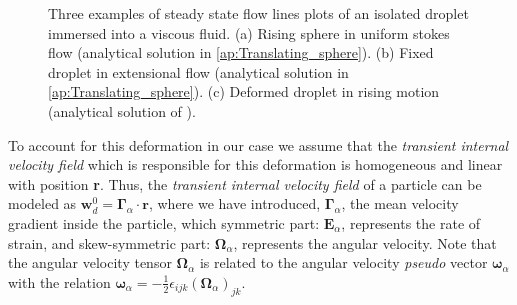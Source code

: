 \begin{figure}
    \centering
    \caption{Three examples of steady state flow lines plots of an isolated droplet immersed into a viscous fluid. 
    (a) Rising sphere in uniform stokes flow (analytical solution in \ref{ap:Translating_sphere}). 
    (b) Fixed droplet in extensional flow (analytical solution in \ref{ap:Translating_sphere}).
    (c) Deformed droplet in rising motion (analytical solution of \citet{taylor1964deformation}). }
    \label{fig:flowlines}
\end{figure} 
To account for this deformation in our case we assume that the \textit{transient internal velocity field} which is responsible for this deformation is homogeneous and linear with position \textbf{r}. 
Thus, the \textit{transient internal velocity field} of a particle can be modeled as $\textbf{w}_d^0 = \bm\Gamma_\alpha \cdot \textbf{r}$, where we have introduced, $\bm\Gamma_\alpha$, the mean velocity gradient inside the particle, which symmetric part: $\textbf{E}_\alpha$, represents the rate of strain, and skew-symmetric part: $\bm\Omega_\alpha$, represents the angular velocity. 
Note that the angular velocity tensor $\bm\Omega_\alpha$ is related to the angular velocity \textit{pseudo} vector $\bm\omega_\alpha$ with the relation $\bm\omega_\alpha = -\frac{1}{2}\epsilon_{ijk} (\bm\Omega_\alpha)_{jk}$. 

